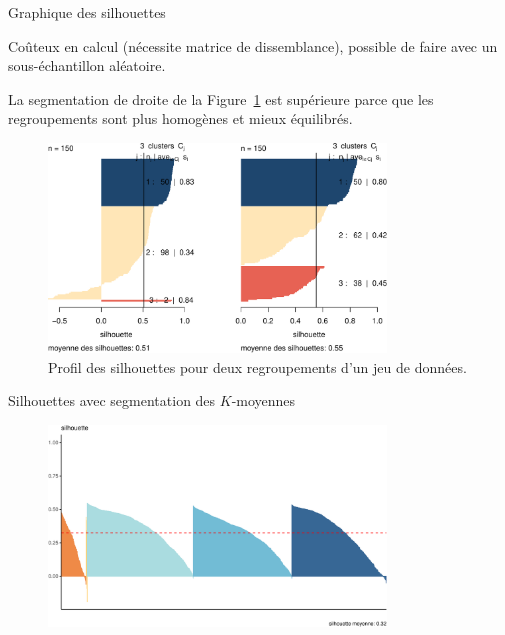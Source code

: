 \documentclass[
  ignorenonframetext,
]{beamer}
\begin{document}
\begin{frame}{Graphique des silhouettes}
\protect\hypertarget{graphique-des-silhouettes}{}
\footnotesize

Coûteux en calcul (nécessite matrice de dissemblance), possible de faire
avec un sous-échantillon aléatoire.

La segmentation de droite de la Figure~\ref{fig-silhouette} est
supérieure parce que les regroupements sont plus homogènes et mieux
équilibrés.

\begin{figure}

{\centering \includegraphics[width=0.8\textwidth,height=\textheight]{MATH60602-diapos11_files/figure-beamer/fig-silhouette-1.pdf}

}

\caption{\label{fig-silhouette}Profil des silhouettes pour deux
regroupements d'un jeu de données.}

\end{figure}
\end{frame}

\begin{frame}{Silhouettes avec segmentation des \(K\)-moyennes}
\protect\hypertarget{silhouettes-avec-segmentation-des-k-moyennes}{}
\begin{figure}

{\centering \includegraphics[width=0.8\textwidth,height=\textheight]{MATH60602-diapos11_files/figure-beamer/unnamed-chunk-19-1.pdf}

}

\end{figure}
\end{frame}
\end{document}

